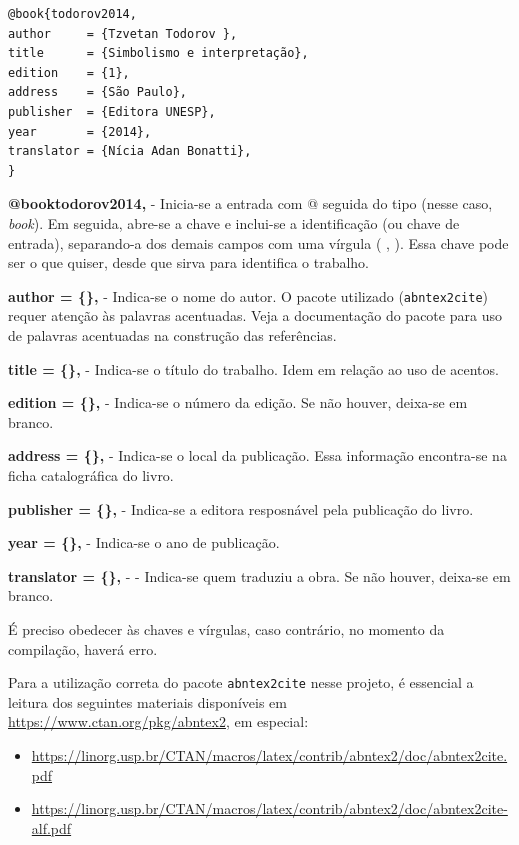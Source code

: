 \documentclass[a4paper,12pt,oneside,openright,extrafontsizes,openbib]{memoir}
\begin{document}
{\begin{multicols}{2}
\begin{verbatim}
@book{todorov2014, 
author     = {Tzvetan Todorov },
title      = {Simbolismo e interpretação},
edition    = {1},
address    = {São Paulo},
publisher  = {Editora UNESP},
year       = {2014},
translator = {Nícia Adan Bonatti},
}
\end{verbatim}
\end{multicols}


{\textbf{@book{todorov2014,}} - Inicia-se a entrada com @ seguida do tipo (nesse caso, \textit{book}). Em seguida, abre-se a chave e inclui-se a identificação (ou chave de entrada), separando-a dos demais campos com uma vírgula ( , ). Essa chave pode ser o que quiser, desde que sirva para identifica o trabalho.
	
{\textbf{author     = \{\},}} - Indica-se o nome do autor. O pacote utilizado (\verb|abntex2cite|) requer atenção às palavras acentuadas. Veja a documentação do pacote para uso de palavras acentuadas na construção das referências.

{\textbf{title      = \{\},}} - Indica-se o título do trabalho. Idem em relação ao uso de acentos.

{\textbf{edition    = \{\},}} - Indica-se o número da edição. Se não houver, deixa-se em branco.

{\textbf{address    = \{\},}} - Indica-se o local da publicação. Essa informação encontra-se na ficha catalográfica do livro.

{\textbf{publisher  = \{\},}} - Indica-se a editora resposnável pela publicação do livro.

{\textbf{year       = \{\},}} - Indica-se o ano de publicação.

{\textbf{translator = \{\},}} - - Indica-se quem traduziu a obra. Se não houver, deixa-se em branco.

É preciso obedecer às chaves e vírgulas, caso contrário, no momento da compilação, haverá erro.

Para a utilização correta do pacote \verb|abntex2cite| nesse projeto, é essencial a leitura dos seguintes materiais disponíveis em \url{https://www.ctan.org/pkg/abntex2}, em especial:

\begin{itemize}
    \item \url{https://linorg.usp.br/CTAN/macros/latex/contrib/abntex2/doc/abntex2cite.pdf}
    \item \url{https://linorg.usp.br/CTAN/macros/latex/contrib/abntex2/doc/abntex2cite-alf.pdf}
\end{itemize}

}}
\end{document}
